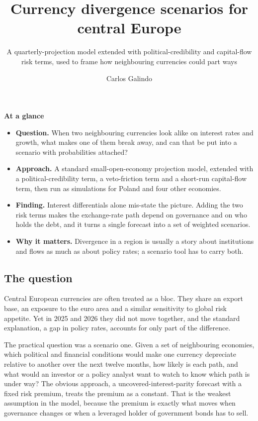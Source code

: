 \documentclass[
  british,
  a4paper,
]{article}
\title{Currency divergence scenarios for central Europe}
\subtitle{A quarterly-projection model extended with
political-credibility and capital-flow risk terms, used to frame how
neighbouring currencies could part ways}
\author{Carlos Galindo}
\date{}
\providecommand{\tightlist}{%
  \setlength{\itemsep}{0pt}\setlength{\parskip}{0pt}}
\begin{document}
\maketitle


\begin{tcolorbox}[enhanced jigsaw, arc=.35mm, bottomrule=.15mm, breakable, colback=white, colframe=quarto-callout-note-color-frame, left=2mm, leftrule=.75mm, opacityback=0, rightrule=.15mm, toprule=.15mm]

\vspace{-3mm}\textbf{At a glance}\vspace{3mm}

\begin{itemize}
\tightlist
\item
  \textbf{Question.} When two neighbouring currencies look alike on
  interest rates and growth, what makes one of them break away, and can
  that be put into a scenario with probabilities attached?
\item
  \textbf{Approach.} A standard small-open-economy projection model,
  extended with a political-credibility term, a veto-friction term and a
  short-run capital-flow term, then run as simulations for Poland and
  four other economies.
\item
  \textbf{Finding.} Interest differentials alone mis-state the picture.
  Adding the two risk terms makes the exchange-rate path depend on
  governance and on who holds the debt, and it turns a single forecast
  into a set of weighted scenarios.
\item
  \textbf{Why it matters.} Divergence in a region is usually a story
  about institutions and flows as much as about policy rates; a scenario
  tool has to carry both.
\end{itemize}

\end{tcolorbox}

\subsection{The question}\label{the-question}

Central European currencies are often treated as a bloc. They share an
export base, an exposure to the euro area and a similar sensitivity to
global risk appetite. Yet in 2025 and 2026 they did not move together,
and the standard explanation, a gap in policy rates, accounts for only
part of the difference.

The practical question was a scenario one. Given a set of neighbouring
economies, which political and financial conditions would make one
currency depreciate relative to another over the next twelve months, how
likely is each path, and what would an investor or a policy analyst want
to watch to know which path is under way? The obvious approach, a
uncovered-interest-parity forecast with a fixed risk premium, treats the
premium as a constant. That is the weakest assumption in the model,
because the premium is exactly what moves when governance changes or
when a leveraged holder of government bonds has to sell.
\end{document}
